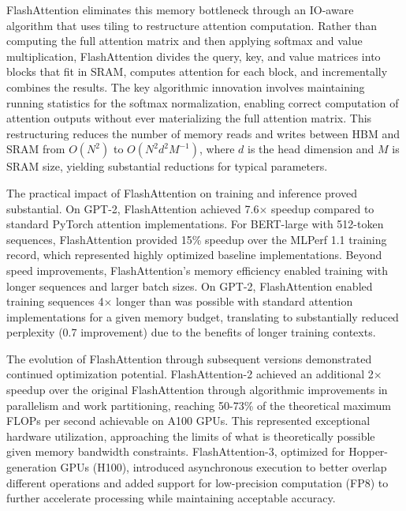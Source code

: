 \documentclass[11pt,letterpaper]{article}
\begin{document}
FlashAttention eliminates this memory bottleneck through an IO-aware algorithm that uses tiling to restructure attention computation. Rather than computing the full attention matrix and then applying softmax and value multiplication, FlashAttention divides the query, key, and value matrices into blocks that fit in SRAM, computes attention for each block, and incrementally combines the results. The key algorithmic innovation involves maintaining running statistics for the softmax normalization, enabling correct computation of attention outputs without ever materializing the full attention matrix. This restructuring reduces the number of memory reads and writes between HBM and SRAM from $O(N^2)$ to $O(N^2 d^2 M^{-1})$, where $d$ is the head dimension and $M$ is SRAM size, yielding substantial reductions for typical parameters.

The practical impact of FlashAttention on training and inference proved substantial. On GPT-2, FlashAttention achieved 7.6$\times$ speedup compared to standard PyTorch attention implementations. For BERT-large with 512-token sequences, FlashAttention provided 15\% speedup over the MLPerf 1.1 training record, which represented highly optimized baseline implementations. Beyond speed improvements, FlashAttention's memory efficiency enabled training with longer sequences and larger batch sizes. On GPT-2, FlashAttention enabled training sequences 4$\times$ longer than was possible with standard attention implementations for a given memory budget, translating to substantially reduced perplexity (0.7 improvement) due to the benefits of longer training contexts.

The evolution of FlashAttention through subsequent versions demonstrated continued optimization potential. FlashAttention-2 \cite{dao2023flashattention2} achieved an additional 2$\times$ speedup over the original FlashAttention through algorithmic improvements in parallelism and work partitioning, reaching 50-73\% of the theoretical maximum FLOPs per second achievable on A100 GPUs. This represented exceptional hardware utilization, approaching the limits of what is theoretically possible given memory bandwidth constraints. FlashAttention-3, optimized for Hopper-generation GPUs (H100), introduced asynchronous execution to better overlap different operations and added support for low-precision computation (FP8) to further accelerate processing while maintaining acceptable accuracy.
\end{document}
